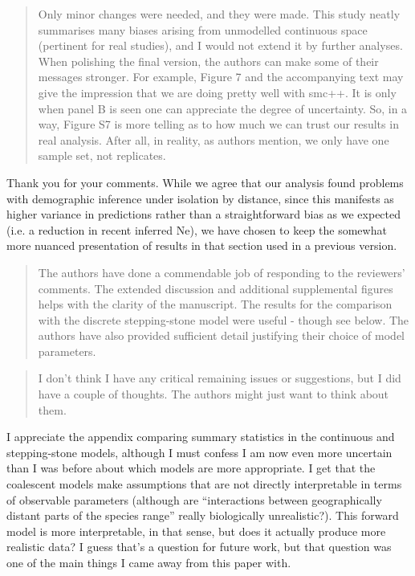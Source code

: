 

\begin{quote}
Only minor changes were needed, and they were made. This study neatly summarises many biases arising from unmodelled continuous space (pertinent for real studies), and I would not extend it by further analyses. When polishing the final version, the authors can make some of their messages stronger. For example, Figure 7 and the accompanying text may give the impression that we are doing pretty well with smc++. It is only when panel B is seen one can appreciate the degree of uncertainty. So, in a way, Figure S7 is more telling as to how much we can trust our results in real analysis. After all, in reality, as authors mention, we only have one sample set, not replicates.
\end{quote}

Thank you for your comments. While we agree that our analysis found problems with demographic inference under isolation by distance, since this manifests as higher variance in predictions rather than a straightforward bias as we expected (i.e. a reduction in recent inferred Ne), we have chosen to keep the somewhat more nuanced presentation of results in that section used in a previous version. 



\begin{quote}
The authors have done a commendable job of responding to the reviewers' comments. The extended discussion and additional supplemental figures helps with the clarity of the manuscript. The results for the comparison with the discrete stepping-stone model were useful - though see below. The authors have also provided sufficient detail justifying their choice of model parameters.
\end{quote}

\begin{quote}
I don't think I have any critical remaining issues or suggestions, but I did have a couple of thoughts. The authors might just want to think about them.
\end{quote}

\begin{point}{}
I appreciate the appendix comparing summary statistics in the continuous and stepping-stone models, although I must confess I am now even more uncertain than I was before about which models are more appropriate. I get that the coalescent models make assumptions that are not directly interpretable in terms of observable parameters (although are ``interactions between geographically distant parts of the species range'' really biologically unrealistic?). This forward model is more interpretable, in that sense, but does it actually produce more realistic data? I guess that's a question for future work, but that question was one of the main things I came away from this paper with.
\end{point}

